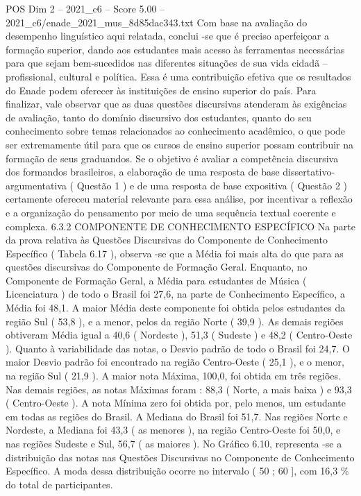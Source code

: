 \begin{textsample}{POS Dim 2 – 2021\_c6 – Score 5.00 – 2021\_c6/enade\_2021\_mus\_8d85dac343.txt}
Com base na avaliação do desempenho linguístico aqui relatada, conclui -se que é preciso aperfeiçoar a formação superior, dando aos estudantes mais acesso às ferramentas necessárias para que sejam bem-sucedidos nas diferentes situações de sua vida cidadã – profissional, cultural e política.
Essa é uma contribuição efetiva que os resultados do Enade podem oferecer às instituições de ensino superior do país.
Para finalizar, vale observar que as duas questões discursivas atenderam às exigências de avaliação, tanto do domínio discursivo dos estudantes, quanto do seu conhecimento sobre temas relacionados ao conhecimento acadêmico, o que pode ser extremamente útil para que os cursos de ensino superior possam contribuir na formação de seus graduandos.
Se o objetivo é avaliar a competência discursiva dos formandos brasileiros, a elaboração de uma resposta de base dissertativo-argumentativa ( Questão 1 ) e de uma resposta de base expositiva ( Questão 2 ) certamente ofereceu material relevante para essa análise, por incentivar a reflexão e a organização do pensamento por meio de uma sequência textual coerente e complexa. 6.3.2 COMPONENTE DE CONHECIMENTO ESPECÍFICO Na parte da prova relativa às Questões Discursivas do Componente de Conhecimento Específico ( Tabela 6.17 ), observa -se que a Média foi mais alta do que para as questões discursivas do Componente de Formação Geral.
Enquanto, no Componente de Formação Geral, a Média para estudantes de Música ( Licenciatura ) de todo o Brasil foi 27,6, na parte de Conhecimento Específico, a Média foi 48,1.
A maior Média deste componente foi obtida pelos estudantes da região Sul ( 53,8 ), e a menor, pelos da região Norte ( 39,9 ).
As demais regiões obtiveram Média igual a 40,6 ( Nordeste ), 51,3 ( Sudeste ) e 48,2 ( Centro-Oeste ).
Quanto à variabilidade das notas, o Desvio padrão de todo o Brasil foi 24,7.
O maior Desvio padrão foi encontrado na região Centro-Oeste ( 25,1 ), e o menor, na região Sul ( 21,9 ).
A maior nota Máxima, 100,0, foi obtida em três regiões.
Nas demais regiões, as notas Máximas foram : 88,3 ( Norte, a mais baixa ) e 93,3 ( Centro-Oeste ).
A nota Mínima zero foi obtida por, pelo menos, um estudante em todas as regiões do Brasil.
A Mediana do Brasil foi 51,7.
Nas regiões Norte e Nordeste, a Mediana foi 43,3 ( as menores ), na região Centro-Oeste foi 50,0, e nas regiões Sudeste e Sul, 56,7 ( as maiores ).
No Gráfico 6.10, representa -se a distribuição das notas nas Questões Discursivas no Componente de Conhecimento Específico.
A moda dessa distribuição ocorre no intervalo ( 50 ; 60 ], com 16,3 \% do total de participantes.

\end{textsample}
